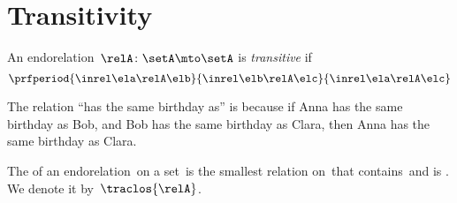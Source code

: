 
\section{Transitivity}

\begin{ctdefinition}
    \label{def:transitive-relation}
    An endorelation~$\relA\colon \setA\mto \setA$ is \emph{transitive} if
    \begin{equation}\label{eq:transitive}
        \prfperiod{
            \inrel \ela \relA \elb
        }{
            \inrel \elb \relA \elc
        }{
            \inrel \ela \relA \elc
        }
    \end{equation}
\end{ctdefinition}

\begin{example}
    The relation ``has the same birthday as'' is  because if Anna has the same birthday as Bob, and Bob has the same birthday as Clara, then Anna has the same birthday as Clara.
\end{example}

\begin{ctdefinition}
    \label{def:transitive-closure}
    The  of an endorelation~\relA on a set~\setA is the smallest relation on~\setA that contains~\relA and is .
    We denote it by~$\traclos{\relA}$.
\end{ctdefinition}


